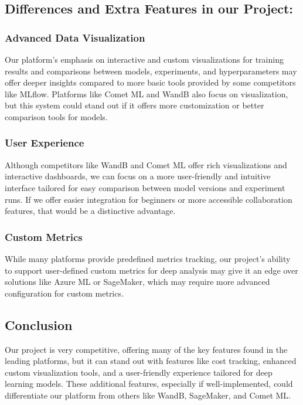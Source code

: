 \documentclass[12pt]{article}
\begin{document}
\subsection{Differences and Extra Features in our Project:}

\subsubsection*{Advanced Data Visualization}
Our platform's emphasis on interactive and custom visualizations for training results and comparisons between models, experiments, and hyperparameters may offer deeper insights compared to more basic tools provided by some competitors like MLflow. Platforms like Comet ML and WandB also focus on visualization, but this system could stand out if it offers more customization or better comparison tools for models.

\subsubsection*{User Experience}
Although competitors like WandB and Comet ML offer rich visualizations and interactive dashboards, we can focus on a more user-friendly and intuitive interface tailored for easy comparison between model versions and experiment runs. If we offer easier integration for beginners or more accessible collaboration features, that would be a distinctive advantage.

\subsubsection*{Custom Metrics}
While many platforms provide predefined metrics tracking, our project’s ability to support user-defined custom metrics for deep analysis may give it an edge over solutions like Azure ML or SageMaker, which may require more advanced configuration for custom metrics.

\subsection{Conclusion}
Our project is very competitive, offering many of the key features found in the leading platforms, but it can stand out with features like cost tracking, enhanced custom visualization tools, and a user-friendly experience tailored for deep learning models. These additional features, especially if well-implemented, could differentiate our platform from others like WandB, SageMaker, and Comet ML.
\end{document}
